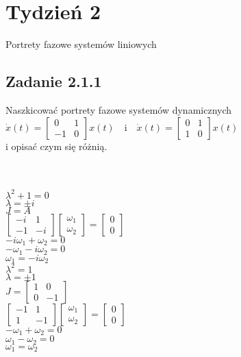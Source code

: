 \pagebreak
\section*{Tydzień 2}
Portrety fazowe systemów liniowych
\subsection*{Zadanie 2.1.1} {\color{darkgray}
	Naszkicować portrety fazowe systemów dynamicznych\\
	$\dot{x}(t)=\left[\begin{array}{cc}0&1\\-1&0\end{array}\right]x(t)\ \ \ $ i $\ \ \ \dot{x}(t)=\left[\begin{array}{cc}0&1\\1&0\end{array}\right]x(t)$\\
	i opisać czym się różnią.\\
}\lineh
\\\\
\begin{multicols}{2}\noindent
$\lambda^2+1=0$\\
$\lambda = \pm i$\\
$J=A$\\
$\left[\begin{array}{cc}-i&1\\-1&-i\end{array}\right]\left[\begin{array}{c}\omega_1\\ \omega_2\end{array}\right]=\left[\begin{array}{c}0\\0\end{array}\right]$\\
$-i\omega_1+\omega_2 =0$\\
$-\omega_1-i\omega_2=0$\\
$\omega_1=-i\omega_2$
\\
$\lambda^2=1$\\
$\lambda = \pm 1$\\
$J=\left[\begin{array}{cc}1&0\\0&-1\end{array}\right]$\\
$\left[\begin{array}{cc}-1&1\\1&-1\end{array}\right]\left[\begin{array}{c}\omega_1\\ \omega_2\end{array}\right]=\left[\begin{array}{c}0\\0\end{array}\right]$\\
$-\omega_1+\omega_2 =0$\\
$\omega_1-\omega_2=0$\\
$\omega_1=\omega_2$\\
\end{multicols}
